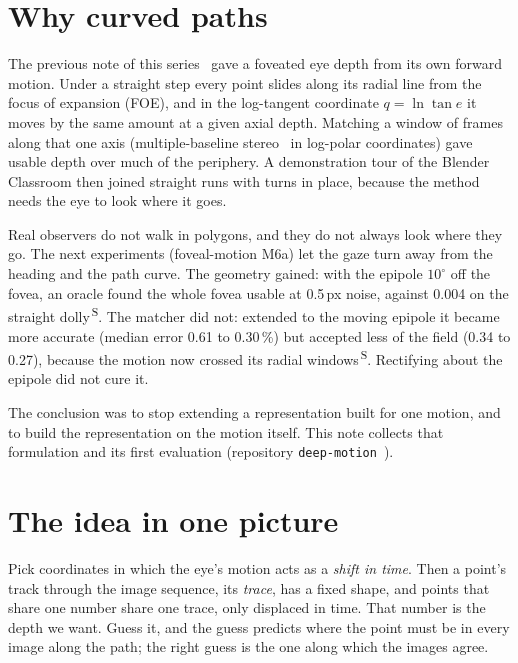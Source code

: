 \documentclass[11pt,a4paper]{article}
\newcommand{\code}[1]{\texttt{\small #1}}
\newcommand{\src}[1]{\textsuperscript{\,#1}}
\newcommand{\SB}{\src{S}}   %
\begin{document}
\section{Why curved paths}\label{sec:why}

The previous note of this series~\cite{tr2} gave a foveated eye depth from its own forward motion. Under a straight
step every point slides along its radial line from the focus of expansion (FOE), and in the log-tangent coordinate
$q=\ln\tan e$ it moves by the same amount at a given axial depth. Matching a window of frames along that one axis
(multiple-baseline stereo~\cite{okutomi} in log-polar coordinates) gave usable depth over much of the periphery. A
demonstration tour of the Blender Classroom then joined straight runs with turns in place, because the method needs the
eye to look where it goes.

Real observers do not walk in polygons, and they do not always look where they go. The next experiments (foveal-motion
M6a) let the gaze turn away from the heading and the path curve. The geometry gained: with the epipole $10^\circ$ off the
fovea, an oracle found the whole fovea usable at 0.5\,px noise, against 0.004 on the straight dolly\SB. The matcher did
not: extended to the moving epipole it became more accurate (median error 0.61 to 0.30\,\%) but accepted less of the field
(0.34 to 0.27), because the motion now crossed its radial windows\SB. Rectifying about the epipole did not cure it.

The conclusion was to stop extending a representation built for one motion, and to build the representation on the
motion itself. This note collects that formulation and its first evaluation (repository \code{deep-motion}~\cite{dm}).

\section{The idea in one picture}\label{sec:idea}

Pick coordinates in which the eye's motion acts as a \emph{shift in time}. Then a point's track through the image
sequence, its \emph{trace}, has a fixed shape, and points that share one number share one trace, only displaced in
time. That number is the depth we want. Guess it, and the guess predicts where the point must be in every image along
the path; the right guess is the one along which the images agree.
\end{document}

